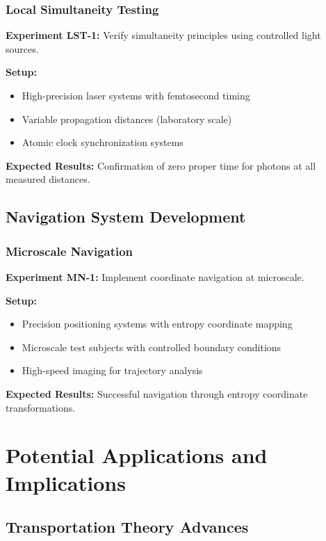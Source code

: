 \documentclass[12pt,a4paper]{article}
\begin{document}
\subsubsection{Local Simultaneity Testing}

\textbf{Experiment LST-1:} Verify simultaneity principles using controlled light sources.

\textbf{Setup:}
\begin{itemize}
\item High-precision laser systems with femtosecond timing
\item Variable propagation distances (laboratory scale)
\item Atomic clock synchronization systems
\end{itemize}

\textbf{Expected Results:} Confirmation of zero proper time for photons at all measured distances.

\subsection{Navigation System Development}

\subsubsection{Microscale Navigation}

\textbf{Experiment MN-1:} Implement coordinate navigation at microscale.

\textbf{Setup:}
\begin{itemize}
\item Precision positioning systems with entropy coordinate mapping
\item Microscale test subjects with controlled boundary conditions
\item High-speed imaging for trajectory analysis
\end{itemize}

\textbf{Expected Results:} Successful navigation through entropy coordinate transformations.

\section{Potential Applications and Implications}

\subsection{Transportation Theory Advances}
\end{document}

